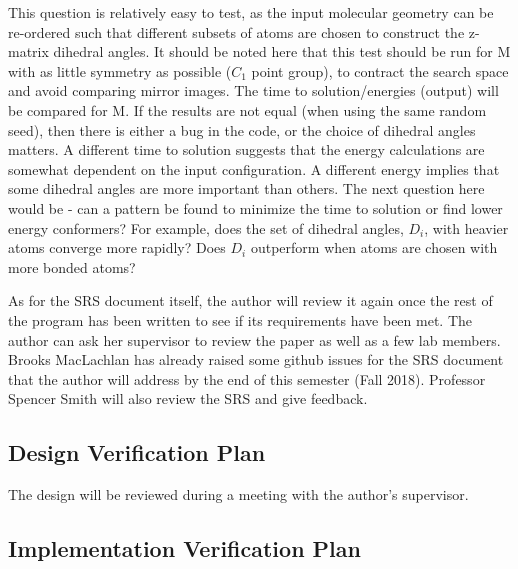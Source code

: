\documentclass[12pt, titlepage]{article}
\begin{document}
This question is relatively easy to test, as the input molecular geometry can 
be re-ordered such that different subsets of atoms are chosen to construct the 
z-matrix dihedral angles. It should be noted here that this test should be run 
for M with as little symmetry as possible ($C_1$ point group), to contract the 
search space and avoid comparing mirror images. The time to solution/energies 
(output) will be compared for M. If the results are not equal (when using the 
same random seed), then there is either a bug in the code, or the choice of 
dihedral angles matters. A different time to solution suggests that the energy 
calculations are somewhat dependent on the input configuration. A different 
energy implies that some dihedral angles are more important than others. The 
next question here would be - can a pattern be found to minimize the time to 
solution or find lower energy conformers? For example, does the set of dihedral 
angles, $D_i$, with heavier atoms converge more rapidly? Does $D_i$ outperform 
when atoms are chosen with more bonded atoms?


As for the SRS document itself, the author will review it again once the rest 
of the program has been written to see if its requirements have been met. The 
author can ask her supervisor to review the paper as well as a few lab members. 
Brooks MacLachlan has already raised some github issues for the SRS document 
that the author will address by the end of this semester (Fall 2018). Professor 
Spencer Smith will also review the SRS and give feedback.


\subsection{Design Verification Plan}

The design will be reviewed during a meeting with the author's supervisor.


\subsection{Implementation Verification Plan}
\end{document}
